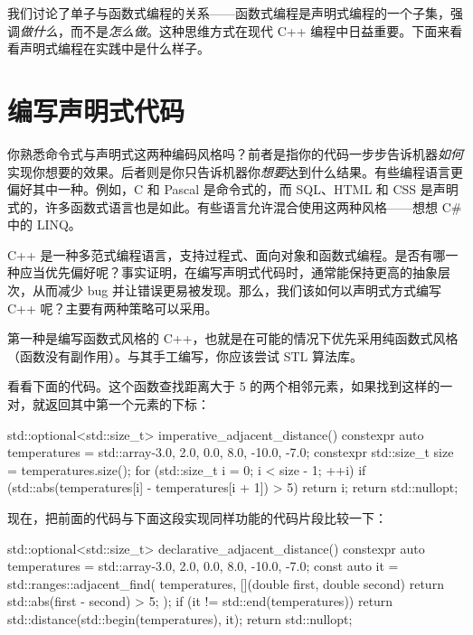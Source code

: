 我们讨论了单子与函数式编程的关系——函数式编程是声明式编程的一个子集，强调\emph{做什么}，而不是\emph{怎么做}。这种思维方式在现代 C++ 编程中日益重要。下面来看看声明式编程在实践中是什么样子。

\section{编写声明式代码}

\label{idx:478}
你熟悉命令式与声明式这两种编码风格吗？前者是指你的代码一步步告诉机器\emph{如何}实现你想要的效果。后者则是你只告诉机器你\emph{想要}达到什么结果。有些编程语言更偏好其中一种。例如，C 和 Pascal 是命令式的，而 SQL、HTML 和 CSS 是声明式的，许多函数式语言也是如此。有些语言允许混合使用这两种风格——想想 C\# 中的 LINQ。

C++ 是一种多范式编程语言，支持过程式、面向对象和函数式编程。是否有哪一种应当优先偏好呢？事实证明，在编写声明式代码时，通常能保持更高的抽象层次，从而减少 bug 并让错误更易被发现。那么，我们该如何以声明式方式编写 C++ 呢？主要有两种策略可以采用。

第一种是编写函数式风格的 C++，也就是在可能的情况下优先采用纯函数式风格（函数没有副作用）。与其手工编写，你应该尝试 STL 算法库。

看看下面的代码。这个函数查找距离大于 5 的两个相邻元素，如果找到这样的一对，就返回其中第一个元素的下标：

\begin{codebox}[cpp]
std::optional<std::size_t> imperative_adjacent_distance() {
  constexpr auto temperatures = std::array{-3.0, 2.0, 0.0, 8.0, -10.0, -7.0};
  constexpr std::size_t size = temperatures.size();
  for (std::size_t i = 0; i < size - 1; ++i) {
    if (std::abs(temperatures[i] - temperatures[i + 1]) > 5) {
      return i;
    }
  }
  return std::nullopt;
}
\end{codebox}

现在，把前面的代码与下面这段实现同样功能的代码片段比较一下：

\begin{codebox}[cpp]
std::optional<std::size_t> declarative_adjacent_distance() {
    constexpr auto temperatures = std::array{-3.0, 2.0, 0.0, 8.0, -10.0, -7.0};
    const auto it = std::ranges::adjacent_find(
        temperatures, [](double first, double second) {
            return std::abs(first - second) > 5;
        });
    if (it != std::end(temperatures)) {
        return std::distance(std::begin(temperatures), it);
    }
    return std::nullopt;
}
\end{codebox}

